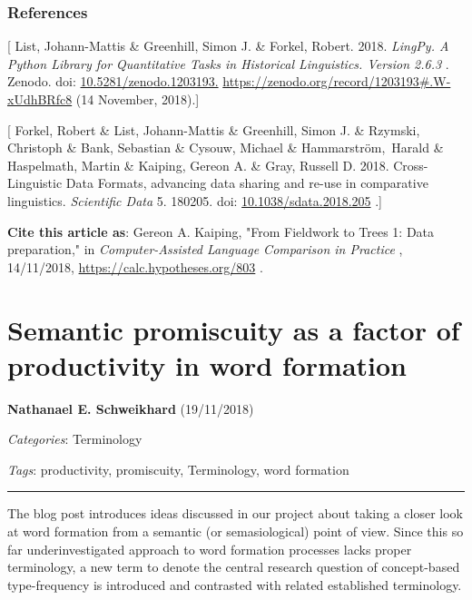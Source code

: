 \documentclass[
  english,
  a4paper,
  oneside,tablecaptionabove
]{scrbook}
\begin{document}
\hypertarget{references-4}{%
\subsection*{References}\label{references-4}}

{[} List, Johann-Mattis \& Greenhill, Simon J. \& Forkel, Robert. 2018.
\emph{LingPy. A Python Library for Quantitative Tasks in Historical
Linguistics. Version 2.6.3} . Zenodo. doi:
\href{https://doi.org/10.5281/zenodo.1203193.}{10.5281/zenodo.1203193.}
\url{https://zenodo.org/record/1203193\#.W-xUdhBRfc8} (14 November,
2018).{]}

{[} Forkel, Robert \& List, Johann-Mattis \& Greenhill, Simon J. \&
Rzymski, Christoph \& Bank, Sebastian \& Cysouw, Michael \&
Hammarström,~Harald \& Haspelmath, Martin \& Kaiping, Gereon A. \& Gray,
Russell D. 2018. Cross-Linguistic Data Formats, advancing data sharing
and re-use in comparative linguistics. \emph{Scientific Data} 5. 180205.
doi:
\href{https://doi.org/10.1038/sdata.2018.205}{10.1038/sdata.2018.205}
.{]}

\textbf{Cite this article as}: Gereon A. Kaiping, "From Fieldwork to
Trees 1: Data preparation," in \emph{Computer-Assisted Language
Comparison in Practice} , 14/11/2018,
\url{https://calc.hypotheses.org/803} .

\hypertarget{semantic-promiscuity-as-a-factor-of-productivity-in-word-formation}{%
\chapter{Semantic promiscuity as a factor of productivity in word
formation}\label{semantic-promiscuity-as-a-factor-of-productivity-in-word-formation}}

\textbf{Nathanael E. Schweikhard} (19/11/2018)

\emph{Categories}: Terminology

\emph{Tags}: productivity, promiscuity, Terminology, word formation

\begin{center}\rule{0.5\linewidth}{\linethickness}\end{center}

The blog post introduces ideas discussed in our project about taking a
closer look at word formation from a semantic (or semasiological) point
of view. Since this so far underinvestigated approach to word formation
processes lacks proper terminology, a new term to denote the central
research question of concept-based type-frequency is introduced and
contrasted with related established terminology.
\end{document}
